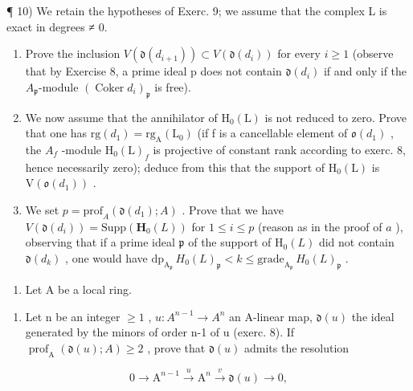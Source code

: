 ¶ 10) We retain the hypotheses of Exerc. 9; we assume that the complex L is exact in degrees ≠ 0.

\begin{enumerate}
\def\labelenumi{\alph{enumi})}
\item
  Prove the inclusion \(V(\mathfrak{d}(d_{i+1})) \subset V(\mathfrak{d}(d_i))\) for every \(i \geqslant 1\) (observe that by Exercise 8, a prime ideal p does not contain \(\mathfrak{d}(d_i)\) if and only if the \(A_{\mathfrak{p}}\)-module \((\operatorname{Coker} d_i)_{\mathfrak{p}}\) is free).
\item
  We now assume that the annihilator of \(\mathrm{H}_{0}(\mathrm{L})\) is not reduced to zero. Prove that one has \(\mathrm{rg}(d_{1}) = \mathrm{rg}_{\mathrm{A}}(\mathrm{L}_{0})\) (if f is a cancellable element of \(\mathfrak{o}(d_{1})\) , the \(A_{f}\) -module \(\mathrm{H}_{0}(\mathrm{L})_{f}\) is projective of constant rank according to exerc. 8, hence necessarily zero); deduce from this that the support of \(\mathrm{H}_{0}(\mathrm{L})\) is \(\mathrm{V}(\mathfrak{o}(d_{1}))\) .
\item
  We set \(p = \text{prof}_A(\mathfrak{d}(d_1); A)\) . Prove that we have \(V(\mathfrak{d}(d_i)) = \text{Supp}(\mathbf{H}_0(L))\) for \(1 \leqslant i \leqslant p\) (reason as in the proof of \(a\) ), observing that if a prime ideal \(\mathfrak{p}\) of the support of \(\mathrm{H}_0(L)\) did not contain \(\mathfrak{d}(d_k)\) , one would have \(\text{dp}_{\mathrm{A}_{\mathfrak{p}}} \, H_0(L)_{\mathfrak{p}} < k \leqslant \text{grade}_{\mathrm{A}_{\mathfrak{p}}} \, H_0(L)_{\mathfrak{p}}\) .
\end{enumerate}

\begin{enumerate}
\def\labelenumi{\arabic{enumi})}
\setcounter{enumi}{10}
\tightlist
\item
  Let A be a local ring.
\end{enumerate}

\begin{enumerate}
\def\labelenumi{\alph{enumi})}
\tightlist
\item
  Let n be an integer \(\geqslant 1\) , \(u : A^{n-1} \to A^n\) an A-linear map, \(\mathfrak{d}(u)\) the ideal generated by the minors of order n-1 of u (exerc. 8). If \(\operatorname{prof}_{\mathrm{A}}(\mathfrak{d}(u); A) \geqslant 2\) , prove that \(\mathfrak{d}(u)\) admits the resolution
\end{enumerate}

\[
0 \rightarrow \mathrm{A} ^ {n - 1} \xrightarrow {u} \mathrm{A} ^ {n} \xrightarrow {v} \mathfrak {d} (u) \rightarrow 0,
\]

